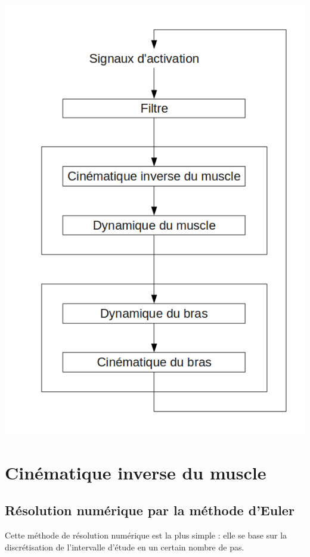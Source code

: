 \documentclass[pdftex,a4paper,11pt]{article}
\numberwithin{equation}{subsection}
\begin{document}
\paragraph{}
\begin{center}
        \includegraphics[width=.60\linewidth]{fig/modules}
\end{center}


\section{Cinématique inverse du muscle}

\subsection{Résolution numérique par la méthode d'Euler}

Cette méthode de résolution numérique est la plus simple : elle se base sur la discrétisation de l'intervalle d'étude en un certain nombre de pas.
\end{document}
